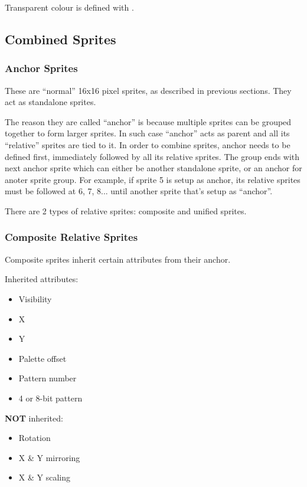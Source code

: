 Transparent colour is defined with .


\pagebreak
\subsection{Combined Sprites}

\subsubsection{Anchor Sprites}

These are ``normal'' 16x16 pixel sprites, as described in previous sections. They act as standalone sprites.

The reason they are called ``anchor'' is because multiple sprites can be grouped together to form larger sprites. In such case ``anchor'' acts as parent and all its ``relative'' sprites are tied to it. In order to combine sprites, anchor needs to be defined first, immediately followed by all its relative sprites. The group ends with next anchor sprite which can either be another standalone sprite, or an anchor for anoter sprite group. For example, if sprite 5 is setup as anchor, its relative sprites must be followed at 6, 7, 8... until another sprite that's setup as ``anchor''.

There are 2 types of relative sprites: composite and unified sprites.

\subsubsection{Composite Relative Sprites}

Composite sprites inherit certain attributes from their anchor.

\begin{multicols}{2}
     Inherited attributes:

    \begin{itemize}[topsep=1pt,itemsep=1pt]
        \item Visibility
        \item X
        \item Y
        \item Palette offset
        \item Pattern number
        \item 4 or 8-bit pattern 
    \end{itemize}

    \columnbreak

    \textbf{NOT} inherited:

    \begin{itemize}[topsep=1pt,itemsep=1pt]
        \item Rotation
        \item X \& Y mirroring
        \item X \& Y scaling
    \end{itemize}

\end{multicols}


